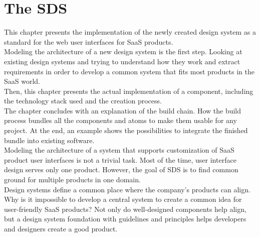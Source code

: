 \newpage
\section{The \acl{SDS}}\label{saas_design_system}
This chapter presents the implementation of the newly created design system as a standard for the web user interfaces for \ac{SaaS} products. \\
Modeling the architecture of a new design system is the first step. Looking at existing design systems and trying to understand how they work and extract requirements in order to develop a common system that fits most products in the \ac{SaaS} world. \\
Then, this chapter presents the actual implementation of a component, including the technology stack used and the creation process. \\
The chapter concludes with an explanation of the build chain. How the build process bundles all the components and atoms to make them usable for any project. At the end, an example shows the possibilities to integrate the finished bundle into existing software.\\
Modeling the architecture of a system that supports customization of \ac{SaaS} product user interfaces is not a trivial task. Most of the time, user interface design serves only one product. However, the goal of \ac{SDS} is to find common ground for multiple products in one domain. \\
Design systems define a common place where the company's products can align. Why is it impossible to develop a central system to create a common idea for user-friendly \ac{SaaS} products? Not only do well-designed components help align, but a design system foundation with guidelines and principles helps developers and designers create a good product. \\





